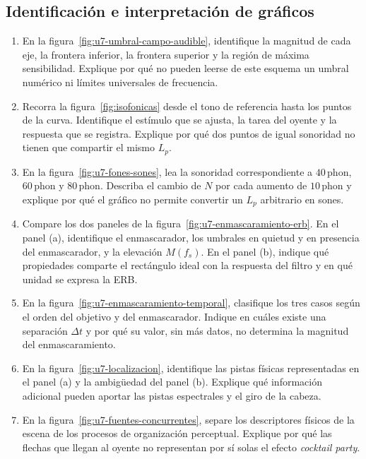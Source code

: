 \subsection*{Identificación e interpretación de gráficos}

\begin{enumerate}[label=\textbf{I\arabic*.},leftmargin=*]
    \item En la figura~\ref{fig:u7-umbral-campo-audible}, identifique la
    magnitud de cada eje, la frontera inferior, la frontera superior y la
    región de máxima sensibilidad. Explique por qué no pueden leerse de este
    esquema un umbral numérico ni límites universales de frecuencia.

    \item Recorra la figura~\ref{fig:isofonicas} desde el tono de referencia
    hasta los puntos de la curva. Identifique el estímulo que se ajusta, la
    tarea del oyente y la respuesta que se registra. Explique por qué dos
    puntos de igual sonoridad no tienen que compartir el mismo \(L_p\).

    \item En la figura~\ref{fig:u7-fones-sones}, lea la sonoridad
    correspondiente a \(40\,\text{phon}\), \(60\,\text{phon}\) y
    \(80\,\text{phon}\). Describa el cambio de \(N\) por cada aumento de
    \(10\,\text{phon}\) y explique por qué el gráfico no permite convertir un
    \(L_p\) arbitrario en sones.

    \item Compare los dos paneles de la
    figura~\ref{fig:u7-enmascaramiento-erb}. En el panel (a), identifique el
    enmascarador, los umbrales en quietud y en presencia del enmascarador, y la
    elevación \(M(f_s)\). En el panel (b), indique qué propiedades comparte el
    rectángulo ideal con la respuesta del filtro y en qué unidad se expresa la
    ERB.

    \item En la figura~\ref{fig:u7-enmascaramiento-temporal}, clasifique los
    tres casos según el orden del objetivo y del enmascarador. Indique en
    cuáles existe una separación \(\Delta t\) y por qué su valor, sin más
    datos, no determina la magnitud del enmascaramiento.

    \item En la figura~\ref{fig:u7-localizacion}, identifique las pistas
    físicas representadas en el panel (a) y la ambigüedad del panel (b).
    Explique qué información adicional pueden aportar las pistas espectrales
    y el giro de la cabeza.

    \item En la figura~\ref{fig:u7-fuentes-concurrentes}, separe los
    descriptores físicos de la escena de los procesos de organización
    perceptual. Explique por qué las flechas que llegan al oyente no
    representan por sí solas el efecto \emph{cocktail party}.
\end{enumerate}

